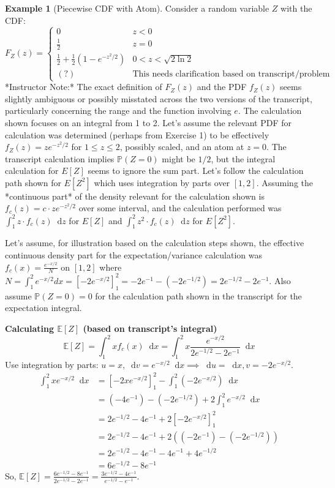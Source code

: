 \documentclass[11pt, letterpaper]{article}
\theoremstyle{plain} %
\theoremstyle{definition} %
\newtheorem{example}[theorem]{Example}
\theoremstyle{remark} %
\newcommand{\E}{\mathbb{E}}
\newcommand{\Prob}{\mathbb{P}}
\newcommand{\dee}{\mathop{}\!\mathrm{d}} %
\begin{document}
\begin{example}[Piecewise CDF with Atom] \label{ex:piecewise_atom}
Consider a random variable $Z$ with the CDF:
\[ F_Z(z) = \begin{cases} 0 & z < 0 \\ \frac{1}{2} & z = 0 \\ \frac{1}{2} + \frac{1}{2}(1 - e^{-z^2/2}) & 0 < z < \sqrt{2 \ln 2} \\ (?) & \text{This needs clarification based on transcript/problem} \end{cases} \]
*Instructor Note:* The exact definition of $F_Z(z)$ and the PDF $f_Z(z)$ seems slightly ambiguous or possibly misstated across the two versions of the transcript, particularly concerning the range and the function involving $e$. The calculation shown focuses on an integral from 1 to 2. Let's assume the relevant PDF for calculation was determined (perhaps from Exercise 1) to be effectively $f_Z(z) = z e^{-z^2/2}$ for $1 \le z \le 2$, possibly scaled, and an atom at $z=0$. The transcript calculation implies $\Prob(Z=0)$ might be $1/2$, but the integral calculation for $E[Z]$ seems to ignore the sum part. Let's follow the calculation path shown for $E[Z^2]$ which uses integration by parts over $[1, 2]$. Assuming the *continuous part* of the density relevant for the calculation shown is $f_c(z) = c \cdot z e^{-z^2/2}$ over some interval, and the calculation performed was $\int_1^2 z \cdot f_c(z) \dee z$ for $E[Z]$ and $\int_1^2 z^2 \cdot f_c(z) \dee z$ for $E[Z^2]$.

Let's assume, for illustration based on the calculation steps shown, the effective continuous density part for the expectation/variance calculation was $f_c(x) = \frac{e^{-x/2}}{N}$ on $[1, 2]$ where $N = \int_1^2 e^{-x/2} dx = [-2e^{-x/2}]_1^2 = -2e^{-1} - (-2e^{-1/2}) = 2e^{-1/2} - 2e^{-1}$. Also assume $\Prob(Z=0)=0$ for the calculation path shown in the transcript for the expectation integral.

\textbf{Calculating $\E[Z]$ (based on transcript's integral)}
\[ \E[Z] = \int_1^2 x f_c(x) \dee x = \int_1^2 x \frac{e^{-x/2}}{2e^{-1/2}-2e^{-1}} \dee x \]
Use integration by parts: $u=x, \dee v = e^{-x/2} \dee x \implies \dee u = \dee x, v = -2e^{-x/2}$.
\begin{align*} \int_1^2 x e^{-x/2} \dee x &= [-2xe^{-x/2}]_1^2 - \int_1^2 (-2e^{-x/2}) \dee x \\ &= (-4e^{-1}) - (-2e^{-1/2}) + 2 \int_1^2 e^{-x/2} \dee x \\ &= 2e^{-1/2} - 4e^{-1} + 2 [-2e^{-x/2}]_1^2 \\ &= 2e^{-1/2} - 4e^{-1} + 2 ((-2e^{-1}) - (-2e^{-1/2})) \\ &= 2e^{-1/2} - 4e^{-1} - 4e^{-1} + 4e^{-1/2} \\ &= 6e^{-1/2} - 8e^{-1} \end{align*}
So, $\E[Z] = \frac{6e^{-1/2} - 8e^{-1}}{2e^{-1/2}-2e^{-1}} = \frac{3e^{-1/2} - 4e^{-1}}{e^{-1/2}-e^{-1}}$.


\end{example}
\end{document}
